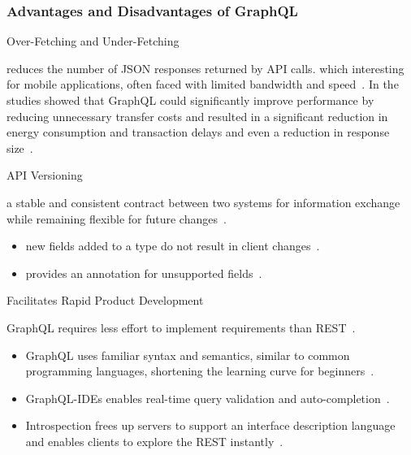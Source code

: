\begin{frame}\frametitle{Advantages and Disadvantages of GraphQL}

\footnotesize

\begin{block}{Over-Fetching and Under-Fetching}

reduces the number of JSON responses returned by API calls. which interesting for mobile applications, often faced with limited bandwidth and speed~\cite{migrating-to-gql,gql-healthcare}. In the studies showed that GraphQL could significantly improve performance by reducing unnecessary transfer costs and resulted in a significant reduction in energy consumption and transaction delays and even a reduction in response size~\cite{migrating-to-gql,real-time-sys-arc-based-on-gql,gql-iot}.
\end{block}

\begin{block}{API Versioning}

a stable and consistent contract between two systems for information exchange while remaining flexible for future changes~\cite{gql-healthcare}. 

\begin{itemize}
  \item new fields added to a type do not result in client changes~\cite{migrating-to-gql}. 
  \item provides an  annotation for unsupported fields~\cite{migrating-to-gql}. 
\end{itemize}

\end{block}

\begin{block}{Facilitates Rapid Product Development}

GraphQL requires less effort to implement requirements than REST~\cite{rest-vs-gql-controlled-experiment}.

\begin{itemize}
  \item  GraphQL uses familiar syntax and semantics, similar to common programming languages, shortening the learning curve for beginners~\cite{rest-vs-gql-controlled-experiment}.
  \item GraphQL-IDEs enables real-time query validation and auto-completion~\cite{rest-vs-gql-controlled-experiment,migrating-to-gql}.
  \item Introspection frees up servers to support an interface description language and enables clients to explore the REST instantly~\cite{migrating-to-gql}. 
\end{itemize}

\end{block}



\end{frame}

